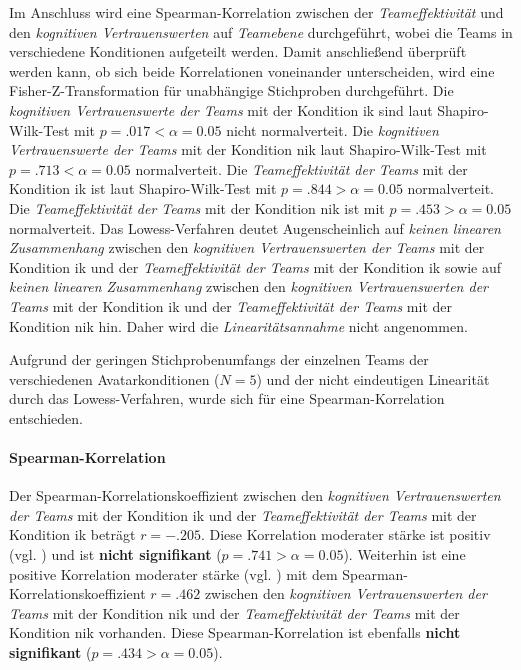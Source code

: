 \documentclass[a4paper,11pt]{article}%
\renewcommand{\\}{\vspace*{0.5\baselineskip} \newline}
\begin{document}
Im Anschluss wird eine Spearman-Korrelation zwischen der \textit{Teameffektivität} und den \textit{kognitiven Vertrauenswerten} auf \textit{Teamebene} durchgeführt, wobei die Teams in verschiedene Konditionen aufgeteilt werden. Damit anschließend überprüft werden kann, ob sich beide Korrelationen voneinander unterscheiden, wird eine Fisher-Z-Transformation für unabhängige Stichproben durchgeführt.\\
%
Die \textit{kognitiven Vertrauenswerte der Teams} mit der Kondition \ac{ik} sind laut Shapiro-Wilk-Test mit $p = .017 < \alpha = 0.05$ nicht normalverteit. \newline
Die \textit{kognitiven Vertrauenswerte der Teams} mit der Kondition \ac{nik} laut Shapiro-Wilk-Test mit $p = .713 < \alpha = 0.05$ normalverteit. \newline
Die \textit{Teameffektivität der Teams} mit der Kondition \ac{ik} ist laut Shapiro-Wilk-Test mit $p = .844 > \alpha = 0.05$ normalverteit. \newline
Die \textit{Teameffektivität der Teams} mit der Kondition \ac{nik} ist mit $p = .453 > \alpha = 0.05$ normalverteit. \\
Das Lowess-Verfahren deutet Augenscheinlich auf \textit{keinen linearen Zusammenhang} zwischen den \textit{kognitiven Vertrauenswerten der Teams} mit der Kondition \ac{ik} und der \textit{Teameffektivität der Teams} mit der Kondition \ac{ik} sowie auf \textit{keinen linearen Zusammenhang} zwischen den \textit{kognitiven Vertrauenswerten der Teams} mit der Kondition \ac{ik} und der  \textit{Teameffektivität der Teams} mit der Kondition \ac{nik} hin. Daher wird die \textit{Linearitätsannahme} nicht angenommen.

Aufgrund der geringen Stichprobenumfangs der einzelnen Teams der verschiedenen Avatarkonditionen ($N=5$) und der nicht eindeutigen Linearität durch das Lowess-Verfahren, wurde sich für eine Spearman-Korrelation entschieden.

\paragraph{Spearman-Korrelation}

Der Spearman-Korrelationskoeffizient zwischen den \textit{kognitiven Vertrauenswerten der Teams} mit der Kondition \ac{ik} und der \textit{Teameffektivität der Teams} mit der Kondition \ac{ik} beträgt $r = -.205$. Diese Korrelation moderater stärke ist positiv (vgl. \citep{cohen2013statistical}) und ist \textbf{nicht signifikant} ($p = .741 > \alpha = 0.05$). \\
Weiterhin ist eine positive Korrelation moderater stärke (vgl. \citep{cohen2013statistical}) mit dem Spearman-Korrelationskoeffizient $r = .462$ zwischen den \textit{kognitiven Vertrauenswerten der Teams} mit der Kondition \ac{nik} und der \textit{Teameffektivität der Teams} mit der Kondition \ac{nik} vorhanden. Diese Spearman-Korrelation ist ebenfalls \textbf{nicht signifikant} ($p = .434 > \alpha = 0.05$).
\end{document}
